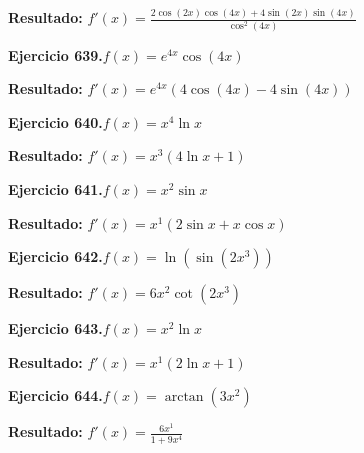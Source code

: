 \documentclass[10pt,a4paper]{article}
\begin{document}
\begin{solbox}
\textbf{Resultado:} \(\displaystyle f'(x) = \frac{2\cos(2x)\cos(4x) + 4\sin(2x)\sin(4x)}{\cos^2(4x)}\)
\end{solbox}

\begin{ejbox}
\textbf{Ejercicio 639.}\quad $f(x) = e^{4x} \cos(4x)$
\end{ejbox}

\begin{solbox}
\textbf{Resultado:} \(\displaystyle f'(x) = e^{4x}(4\cos(4x) - 4\sin(4x))\)
\end{solbox}

\newpage
\begin{ejbox}
\textbf{Ejercicio 640.}\quad $f(x) = x^{4} \ln x$
\end{ejbox}

\begin{solbox}
\textbf{Resultado:} \(\displaystyle f'(x) = x^{3}(4\ln x + 1)\)
\end{solbox}

\begin{ejbox}
\textbf{Ejercicio 641.}\quad $f(x) = x^{2} \sin x$
\end{ejbox}

\begin{solbox}
\textbf{Resultado:} \(\displaystyle f'(x) = x^{1}(2\sin x + x\cos x)\)
\end{solbox}

\begin{ejbox}
\textbf{Ejercicio 642.}\quad $f(x) = \ln(\sin(2x^{3}))$
\end{ejbox}

\begin{solbox}
\textbf{Resultado:} \(\displaystyle f'(x) = 6x^{2}\cot(2x^{3})\)
\end{solbox}

\newpage
\begin{ejbox}
\textbf{Ejercicio 643.}\quad $f(x) = x^{2} \ln x$
\end{ejbox}

\begin{solbox}
\textbf{Resultado:} \(\displaystyle f'(x) = x^{1}(2\ln x + 1)\)
\end{solbox}

\begin{ejbox}
\textbf{Ejercicio 644.}\quad $f(x) = \arctan(3x^{2})$
\end{ejbox}

\begin{solbox}
\textbf{Resultado:} \(\displaystyle f'(x) = \frac{6x^{1}}{1+9x^{4}}\)
\end{solbox}
\end{document}
